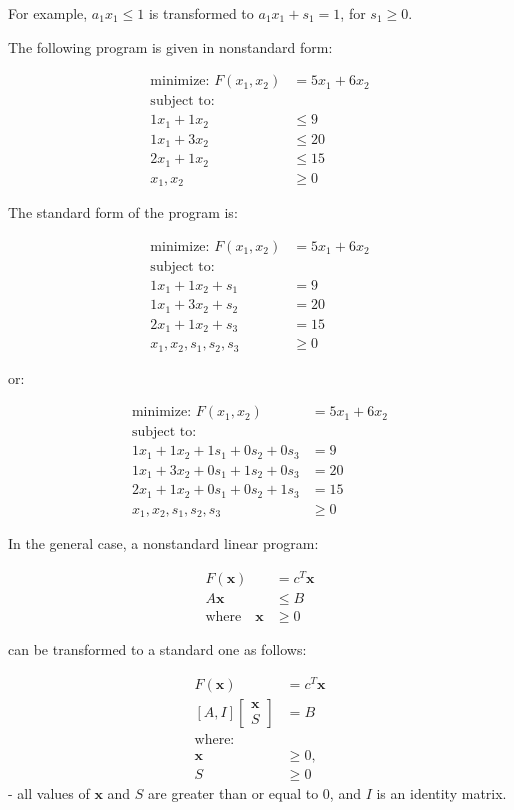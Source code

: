 \documentclass[11pt]{article}
\begin{document}
For example, \(a_1 x_1 \leq 1\) is transformed to \(a_1 x_1 + s_1 = 1\),
for \(s_1 \geq 0\).

The following program is given in nonstandard form:

\[
\begin{aligned}
\text{minimize: } F(x_1, x_2) &= 5x_1 + 6x_2 \\
\text{subject to:} \\
1x_1 + 1x_2 &\leq 9 \\
1x_1 + 3x_2 &\leq 20 \\
2x_1 + 1x_2 &\leq 15 \\
x_1, x_2 &\geq 0
\end{aligned}
\]

The standard form of the program is:

\[
\begin{aligned}
\text{minimize: } F(x_1, x_2) &= 5x_1 + 6x_2 \\
\text{subject to:} \\
1x_1 + 1x_2 + s_1 &= 9 \\
1x_1 + 3x_2 + s_2 &= 20 \\
2x_1 + 1x_2 + s_3 &= 15 \\
x_1, x_2, s_1, s_2, s_3 &\geq 0
\end{aligned}
\]

or:

\[
\begin{aligned}
\text{minimize: } F(x_1, x_2) &= 5x_1 + 6x_2 \\
\text{subject to: } \\
1x_1 + 1x_2 + 1s_1 + 0s_2 + 0s_3 &= 9 \\
1x_1 + 3x_2 + 0s_1 + 1s_2 + 0s_3 &= 20 \\
2x_1 + 1x_2 + 0s_1 + 0s_2 + 1s_3 &= 15 \\
x_1, x_2, s_1, s_2, s_3 &\geq 0
\end{aligned}
\]

In the general case, a nonstandard linear program:

\[
\begin{aligned}
F(\pmb{x}) &= c^T \pmb{x} \\
A \pmb{x} &\leq B \\
\text{where} \quad \pmb{x} &\geq 0
\end{aligned}
\]

can be transformed to a standard one as follows:

\[
\begin{aligned}
F(\pmb{x}) &= c^T \pmb{x} \\
[A, I] \begin{bmatrix} \pmb{x} \\ S \end{bmatrix} &= B \\
\text{where:} \\
\pmb{x} &\geq 0, \\
S &\geq 0
\end{aligned}
\] - all values of \(\pmb{x}\) and \(S\) are greater than or equal to
\(0\), and \(I\) is an identity matrix.
\end{document}
